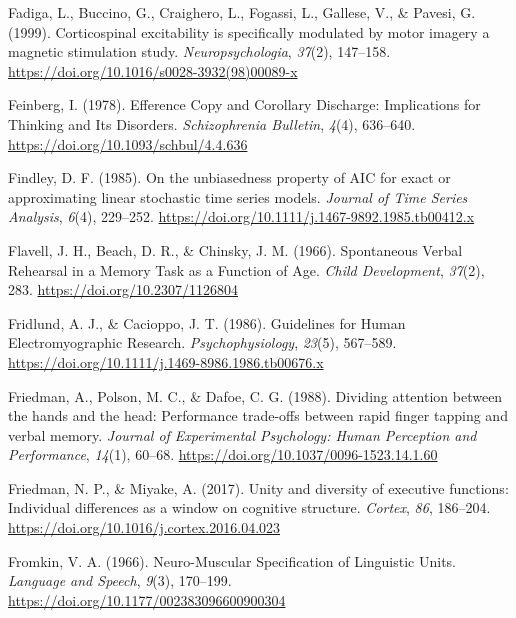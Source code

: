 \documentclass[a4paper,12pt,twoside,openright,oldfontcommands]{memoir}
\begin{document}
\leavevmode\hypertarget{ref-fadiga_corticospinal_1999}{}%
Fadiga, L., Buccino, G., Craighero, L., Fogassi, L., Gallese, V., \& Pavesi, G. (1999). Corticospinal excitability is specifically modulated by motor imagery a magnetic stimulation study. \emph{Neuropsychologia}, \emph{37}(2), 147--158. \url{https://doi.org/10.1016/s0028-3932(98)00089-x}

\leavevmode\hypertarget{ref-feinberg_efference_1978}{}%
Feinberg, I. (1978). Efference Copy and Corollary Discharge: Implications for Thinking and Its Disorders. \emph{Schizophrenia Bulletin}, \emph{4}(4), 636--640. \url{https://doi.org/10.1093/schbul/4.4.636}

\leavevmode\hypertarget{ref-findley_unbiasedness_1985}{}%
Findley, D. F. (1985). On the unbiasedness property of AIC for exact or approximating linear stochastic time series models. \emph{Journal of Time Series Analysis}, \emph{6}(4), 229--252. \url{https://doi.org/10.1111/j.1467-9892.1985.tb00412.x}

\leavevmode\hypertarget{ref-flavell_spontaneous_1966}{}%
Flavell, J. H., Beach, D. R., \& Chinsky, J. M. (1966). Spontaneous Verbal Rehearsal in a Memory Task as a Function of Age. \emph{Child Development}, \emph{37}(2), 283. \url{https://doi.org/10.2307/1126804}

\leavevmode\hypertarget{ref-fridlund_guidelines_1986}{}%
Fridlund, A. J., \& Cacioppo, J. T. (1986). Guidelines for Human Electromyographic Research. \emph{Psychophysiology}, \emph{23}(5), 567--589. \url{https://doi.org/10.1111/j.1469-8986.1986.tb00676.x}

\leavevmode\hypertarget{ref-friedman_dividing_1988}{}%
Friedman, A., Polson, M. C., \& Dafoe, C. G. (1988). Dividing attention between the hands and the head: Performance trade-offs between rapid finger tapping and verbal memory. \emph{Journal of Experimental Psychology: Human Perception and Performance}, \emph{14}(1), 60--68. \url{https://doi.org/10.1037/0096-1523.14.1.60}

\leavevmode\hypertarget{ref-friedman_unity_2017}{}%
Friedman, N. P., \& Miyake, A. (2017). Unity and diversity of executive functions: Individual differences as a window on cognitive structure. \emph{Cortex}, \emph{86}, 186--204. \url{https://doi.org/10.1016/j.cortex.2016.04.023}

\leavevmode\hypertarget{ref-fromkin_neuro-muscular_1966}{}%
Fromkin, V. A. (1966). Neuro-Muscular Specification of Linguistic Units. \emph{Language and Speech}, \emph{9}(3), 170--199. \url{https://doi.org/10.1177/002383096600900304}
\end{document}
